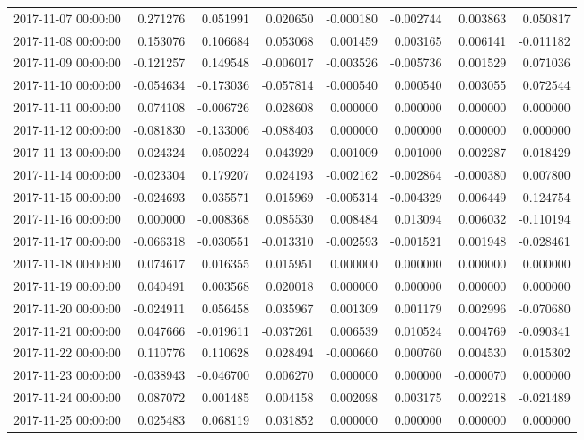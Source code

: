 \begin{tabular}{lrrrrrrr}
2017-11-07 00:00:00 & 0.271276 & 0.051991 & 0.020650 & -0.000180 & -0.002744 & 0.003863 & 0.050817 \\
2017-11-08 00:00:00 & 0.153076 & 0.106684 & 0.053068 & 0.001459 & 0.003165 & 0.006141 & -0.011182 \\
2017-11-09 00:00:00 & -0.121257 & 0.149548 & -0.006017 & -0.003526 & -0.005736 & 0.001529 & 0.071036 \\
2017-11-10 00:00:00 & -0.054634 & -0.173036 & -0.057814 & -0.000540 & 0.000540 & 0.003055 & 0.072544 \\
2017-11-11 00:00:00 & 0.074108 & -0.006726 & 0.028608 & 0.000000 & 0.000000 & 0.000000 & 0.000000 \\
2017-11-12 00:00:00 & -0.081830 & -0.133006 & -0.088403 & 0.000000 & 0.000000 & 0.000000 & 0.000000 \\
2017-11-13 00:00:00 & -0.024324 & 0.050224 & 0.043929 & 0.001009 & 0.001000 & 0.002287 & 0.018429 \\
2017-11-14 00:00:00 & -0.023304 & 0.179207 & 0.024193 & -0.002162 & -0.002864 & -0.000380 & 0.007800 \\
2017-11-15 00:00:00 & -0.024693 & 0.035571 & 0.015969 & -0.005314 & -0.004329 & 0.006449 & 0.124754 \\
2017-11-16 00:00:00 & 0.000000 & -0.008368 & 0.085530 & 0.008484 & 0.013094 & 0.006032 & -0.110194 \\
2017-11-17 00:00:00 & -0.066318 & -0.030551 & -0.013310 & -0.002593 & -0.001521 & 0.001948 & -0.028461 \\
2017-11-18 00:00:00 & 0.074617 & 0.016355 & 0.015951 & 0.000000 & 0.000000 & 0.000000 & 0.000000 \\
2017-11-19 00:00:00 & 0.040491 & 0.003568 & 0.020018 & 0.000000 & 0.000000 & 0.000000 & 0.000000 \\
2017-11-20 00:00:00 & -0.024911 & 0.056458 & 0.035967 & 0.001309 & 0.001179 & 0.002996 & -0.070680 \\
2017-11-21 00:00:00 & 0.047666 & -0.019611 & -0.037261 & 0.006539 & 0.010524 & 0.004769 & -0.090341 \\
2017-11-22 00:00:00 & 0.110776 & 0.110628 & 0.028494 & -0.000660 & 0.000760 & 0.004530 & 0.015302 \\
2017-11-23 00:00:00 & -0.038943 & -0.046700 & 0.006270 & 0.000000 & 0.000000 & -0.000070 & 0.000000 \\
2017-11-24 00:00:00 & 0.087072 & 0.001485 & 0.004158 & 0.002098 & 0.003175 & 0.002218 & -0.021489 \\
2017-11-25 00:00:00 & 0.025483 & 0.068119 & 0.031852 & 0.000000 & 0.000000 & 0.000000 & 0.000000 \\

\end{tabular}
